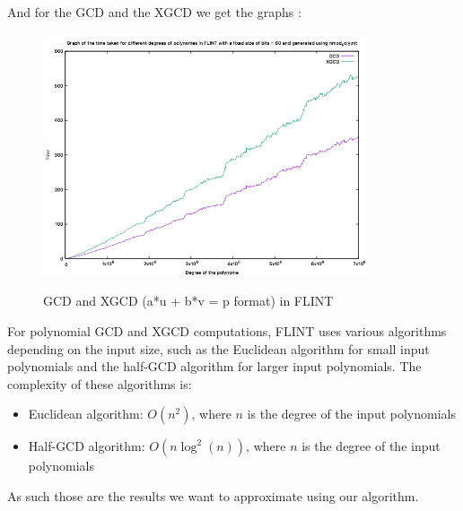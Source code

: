 And for the GCD and the XGCD we get the graphs :
\begin{figure}[H]
    \centering
    \includegraphics[width=0.85\textwidth]{figures/flint_gcd_xgcd.png}
    \label{fig2}
    \caption{GCD and XGCD (a*u + b*v = p format) in FLINT}
\end{figure}
For polynomial GCD and XGCD computations, FLINT uses various algorithms depending on the input size, such as the Euclidean algorithm for small input polynomials and the half-GCD algorithm for larger input polynomials. The complexity of these algorithms is:
\begin{itemize}
    \item Euclidean algorithm: $O(n^2)$, where $n$ is the degree of the input polynomials
    \item Half-GCD algorithm: $O(n \log^2(n))$, where $n$ is the degree of the input polynomials
\end{itemize}

\qquad As such those are the results we want to approximate using our algorithm.
